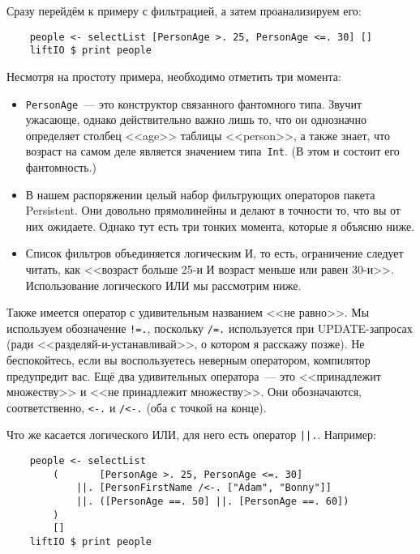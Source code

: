 Сразу перейдём к примеру с фильтрацией, а затем проанализируем его:
\begin{lstlisting}
    people <- selectList [PersonAge >. 25, PersonAge <=. 30] []
    liftIO $ print people
\end{lstlisting}

Несмотря на простоту примера, необходимо отметить три момента:

\begin{itemize}
    \item \lstinline'PersonAge'~--- это конструктор связанного фантомного типа.
        Звучит ужасающе, однако действительно важно лишь то, что он однозначно
        определяет столбец <<age>> таблицы <<person>>, а также знает, что
        возраст на самом деле является значением типа~\lstinline'Int'. (В этом
        и состоит его фантомность.)

    \item В нашем распоряжении целый набор фильтрующих операторов пакета
        Persistent. Они довольно прямолинейны и делают в точности то, что вы от
        них ожидаете. Однако тут есть три тонких момента, которые я объясню
        ниже.

    \item Список фильтров объединяется логическим И, то есть, ограничение
        следует читать, как <<возраст больше 25-и И возраст меньше или равен
        30-и>>. Использование логического ИЛИ мы рассмотрим ниже.
\end{itemize}

Также имеется оператор с удивительным названием <<не равно>>. Мы используем
обозначение \lstinline'!=.', поскольку \lstinline'/=.' используется при
UPDATE-запросах (ради <<разделяй-и-устанавливай>>, о котором я расскажу позже).
Не беспокойтесь, если вы воспользуетесь неверным оператором, компилятор
предупредит вас. Ещё два удивительных оператора~--- это <<принадлежит
множеству>> и <<не принадлежит множеству>>. Они обозначаются, соответственно,
\lstinline'<-.' и \lstinline'/<-.' (оба с точкой на конце).

Что же касается логического ИЛИ, для него есть оператор \lstinline'||.'.
Например:

\begin{lstlisting}
    people <- selectList
        (       [PersonAge >. 25, PersonAge <=. 30]
            ||. [PersonFirstName /<-. ["Adam", "Bonny"]]
            ||. ([PersonAge ==. 50] ||. [PersonAge ==. 60])
        )
        []
    liftIO $ print people
\end{lstlisting}

